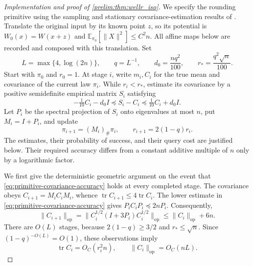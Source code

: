 \documentclass[11pt]{article}
\numberwithin{equation}{section}
\theoremstyle{definition}
\newcommand{\E}[2]{\mathbb{E}_{#1}\left[#2\right]}
\newcommand{\op}{\mathrm{op}}
\begin{document}
\begin{proof}[Implementation and proof of \cref{prelim:thm:wellr_iso}]
We specify the rounding primitive using the sampling and stationary
covariance-estimation results of \cite{KV25,KZ24:arxiv}.
Translate the original input by its known point $z$, so its potential is
$W_0(x)=W(x+z)$ and $\E{\pi_0}{\|X\|^2}\leq C^2n$.
All affine maps below are recorded and composed with this translation.
Set
\[
 L=\max\{4,\log(2n)\},\qquad q=L^{-1},\qquad
 d_0=\frac{nq^2}{100},\qquad r_*=\frac{q^2\sqrt n}{100}.
\]
Start with $\pi_0$ and $r_0=1$.
At stage $i$, write $m_i,C_i$ for the true mean and covariance of the current
law $\pi_i$.
While $r_i<r_*$, estimate its covariance by a positive semidefinite empirical
matrix $S_i$ satisfying
\begin{equation}
\label{eq:primitive-covariance-accuracy}
 -\tfrac1{10}C_i-d_0I\preceq S_i-C_i
 \preceq\tfrac1{10}C_i+d_0I.
\end{equation}
Let $P_i$ be the spectral projection of $S_i$ onto eigenvalues at most $n$,
put $M_i=I+P_i$, and update
\[
 \pi_{i+1}=(M_i)_\#\pi_i,\qquad
 r_{i+1}=2(1-q)r_i.
\]
The estimates, their probability of success, and their query cost are
justified below. Their required accuracy differs from a constant additive
multiple of $n$ only by a logarithmic factor.

We first give the deterministic geometric argument on the event that
\eqref{eq:primitive-covariance-accuracy} holds at every completed stage.
The covariance obeys $C_{i+1}=M_iC_iM_i$, whence
$\operatorname{tr}C_{i+1}\leq4\operatorname{tr}C_i$.
The lower estimate in \eqref{eq:primitive-covariance-accuracy} gives
$P_iC_iP_i\preceq2nP_i$. Consequently,
\[
 \|C_{i+1}\|_{\op}
 =\|C_i^{1/2}(I+3P_i)C_i^{1/2}\|_{\op}
 \leq\|C_i\|_{\op}+6n.
\]
There are $O(L)$ stages, because $2(1-q)\geq3/2$ and $r_*\leq\sqrt n$.
Since $(1-q)^{-O(L)}=O(1)$, these observations imply
\begin{equation}
\label{eq:primitive-covariance-growth}
 \operatorname{tr}C_i=O_C(r_i^2n),
 \qquad
 \|C_i\|_{\op}=O_C(nL).
\end{equation}


\end{proof}
\end{document}
